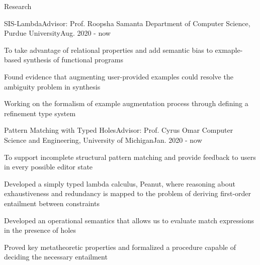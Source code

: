 \documentclass{resume} %
\begin{document}
\begin{rSection}{\large Research}
 
  \begin{rSubsection}
    {SIS-Lambda}{Advisor: Prof. Roopsha Samanta}
    {Department of Computer Science, Purdue University}{Aug. 2020 - now}
  \item To take advantage of relational properties and add semantic bias to
    exmaple-based synthesis of functional programs
  \item Found evidence that augmenting user-provided examples could resolve the
    ambiguity problem in synthesis
  \item Working on the formalism of example augmentation process through defining a
    refinement type system
  \end{rSubsection}
  \begin{rSubsection}
    {Pattern Matching with Typed Holes}{Advisor: Prof. Cyrus Omar}
    {Computer Science and Engineering, University of Michigan}{Jan. 2020 - now}
  \item To support incomplete structural pattern matching and provide feedback
    to users in every possible editor state
  \item Developed a simply typed lambda calculus, Peanut, where reasoning about exhaustiveness
    and redundancy is mapped to the problem of deriving first-order entailment
    between constraints
  \item Developed an operational semantics that allows us to evaluate match
    expressions in the presence of holes
  \item Proved key metatheoretic properties and formalized a procedure capable of
    deciding the necessary entailment
  \end{rSubsection}

\end{rSection}

\end{document}

